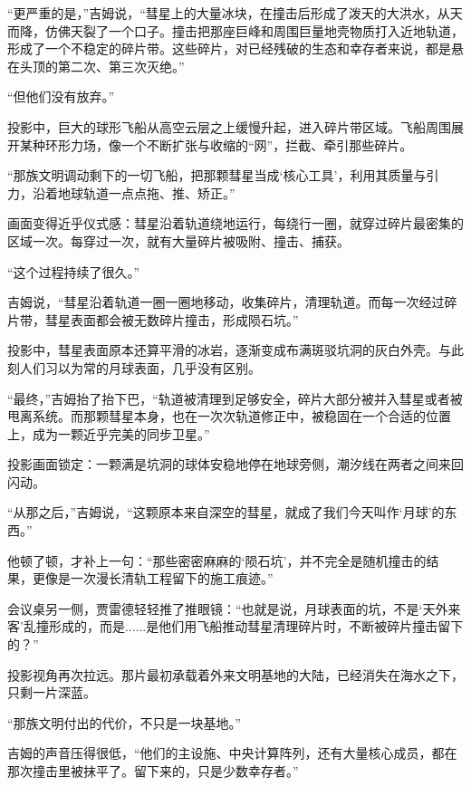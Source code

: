 “更严重的是，”吉姆说，“彗星上的大量冰块，在撞击后形成了泼天的大洪水，从天而降，仿佛天裂了一个口子。撞击把那座巨峰和周围巨量地壳物质打入近地轨道，形成了一个不稳定的碎片带。这些碎片，对已经残破的生态和幸存者来说，都是悬在头顶的第二次、第三次灭绝。”

“但他们没有放弃。”

投影中，巨大的球形飞船从高空云层之上缓慢升起，进入碎片带区域。飞船周围展开某种环形力场，像一个不断扩张与收缩的“网”，拦截、牵引那些碎片。

“那族文明调动剩下的一切飞船，把那颗彗星当成‘核心工具’，利用其质量与引力，沿着地球轨道一点点拖、推、矫正。”

画面变得近乎仪式感：彗星沿着轨道绕地运行，每绕行一圈，就穿过碎片最密集的区域一次。每穿过一次，就有大量碎片被吸附、撞击、捕获。

“这个过程持续了很久。”

吉姆说，“彗星沿着轨道一圈一圈地移动，收集碎片，清理轨道。而每一次经过碎片带，彗星表面都会被无数碎片撞击，形成陨石坑。”

投影中，彗星表面原本还算平滑的冰岩，逐渐变成布满斑驳坑洞的灰白外壳。与此刻人们习以为常的月球表面，几乎没有区别。

“最终，”吉姆抬了抬下巴，“轨道被清理到足够安全，碎片大部分被并入彗星或者被甩离系统。而那颗彗星本身，也在一次次轨道修正中，被稳固在一个合适的位置上，成为一颗近乎完美的同步卫星。”

投影画面锁定：一颗满是坑洞的球体安稳地停在地球旁侧，潮汐线在两者之间来回闪动。

“从那之后，”吉姆说，“这颗原本来自深空的彗星，就成了我们今天叫作‘月球’的东西。”

他顿了顿，才补上一句：“那些密密麻麻的‘陨石坑’，并不完全是随机撞击的结果，更像是一次漫长清轨工程留下的施工痕迹。”

会议桌另一侧，贾雷德轻轻推了推眼镜：“也就是说，月球表面的坑，不是‘天外来客’乱撞形成的，而是......是他们用飞船推动彗星清理碎片时，不断被碎片撞击留下的？”

投影视角再次拉远。那片最初承载着外来文明基地的大陆，已经消失在海水之下，只剩一片深蓝。

“那族文明付出的代价，不只是一块基地。”

吉姆的声音压得很低，“他们的主设施、中央计算阵列，还有大量核心成员，都在那次撞击里被抹平了。留下来的，只是少数幸存者。”
